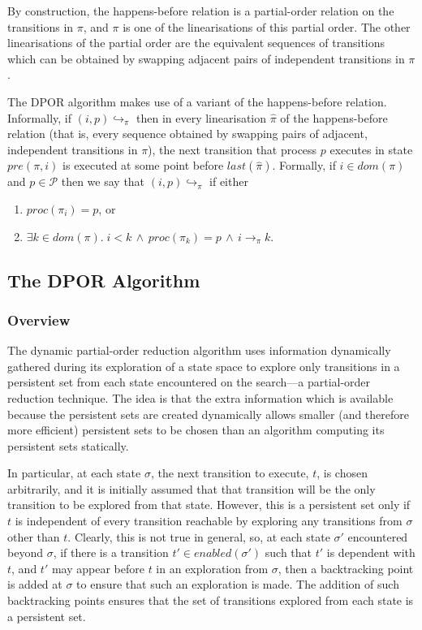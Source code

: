 \documentclass[12pt,a4paper,twoside,openright]{report}
\begin{document}
By construction, the happens-before relation is a
partial-order relation on the transitions in $\pi$,
and $\pi$ is one of the linearisations of this
partial order. The other linearisations of the
partial order are the equivalent sequences of
transitions which can be obtained by swapping
adjacent pairs of independent transitions in $\pi$.

The DPOR algorithm makes use of a variant of the
happens-before relation.
Informally, if $(i, p)\!\hookrightarrow_\pi$ then
in every linearisation $\hat{\pi}$ of the
happens-before relation (that is, every sequence
obtained by swapping pairs of adjacent,
independent transitions in $\pi$), the next
transition that process $p$ executes in
state $\textit{pre}(\pi, i)$ is executed
at some point before $\textit{last}(\hat{\pi})$.
Formally, 
if $i \in \textit{dom}(\pi)$ and $p \in
\mathcal{P}$ then we
say that $(i, p)\!\hookrightarrow_\pi$ if
either
\begin{enumerate}
	\item $\textit{proc}(\pi_i) = p$, or
	\item $\exists k \in \textit{dom}(\pi).\;
	i < k \,\wedge\, \textit{proc}(\pi_k) = p
	\,\wedge\, i \longrightarrow_\pi k $.
\end{enumerate}


\subsection{The DPOR Algorithm}

\subsubsection{Overview}

The dynamic partial-order reduction algorithm
uses information dynamically gathered during its
exploration of a state space to explore only
transitions in a persistent set from each state
encountered on the search---a partial-order
reduction technique. The idea is that the
extra information which is available because
the persistent sets are created dynamically
allows smaller (and therefore more efficient)
persistent sets to be chosen than an algorithm
computing its persistent sets statically.

In particular, at each state $\sigma$, the
next transition
to execute, $t$, is chosen arbitrarily, and it is
initially assumed that that transition will
be the only transition to be explored from
that state. However, this is a persistent
set only if $t$ is
independent of every transition reachable
by exploring any transitions
from $\sigma$ other than $t$. Clearly,
this is not true in general, so, at each
state $\sigma'$ encountered beyond
$\sigma$, if there is a transition
$t' \in \textit{enabled}(\sigma')$
such that $t'$ is dependent with
$t$, and $t'$ may appear before $t$
in an exploration from $\sigma$, then
a backtracking point is added at
$\sigma$ to ensure that such an
exploration is made.
The addition of such backtracking points
ensures that the set of transitions
explored from each state is a
persistent set.
\end{document}
